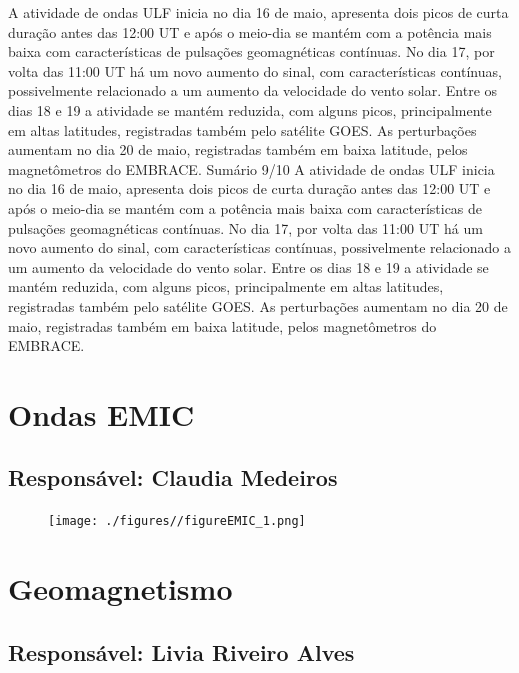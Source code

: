 \documentclass[a4paper, 10pt]{article}
\begin{document}
                        A atividade de ondas ULF inicia no dia 16 de maio, apresenta dois picos de
curta duração antes das 12:00 UT e após o meio-dia se mantém com a
potência mais baixa com características de pulsações geomagnéticas
contínuas. No dia 17, por volta das 11:00 UT há um novo aumento do sinal,
com características contínuas, possivelmente relacionado a um aumento
da velocidade do vento solar. Entre os dias 18 e 19 a atividade se mantém
reduzida, com alguns picos, principalmente em altas latitudes, registradas
também pelo satélite GOES. As perturbações aumentam no dia 20 de maio,
registradas também em baixa latitude, pelos magnetômetros do EMBRACE.
Sumário
9/10
A atividade de ondas ULF inicia no dia 16 de maio, apresenta dois picos de curta duração antes das 12:00 UT e após o meio-dia se mantém com a potência mais baixa com características de pulsações geomagnéticas contínuas. No dia 17, por volta das 11:00 UT há um novo aumento do sinal, com características contínuas, possivelmente relacionado a um aumento da velocidade do vento solar. Entre os dias 18 e 19 a atividade se mantém reduzida, com alguns picos, principalmente em altas latitudes, registradas também pelo satélite GOES. As perturbações aumentam no dia 20 de maio, registradas também em baixa latitude, pelos magnetômetros do EMBRACE.\section{Ondas EMIC} 
 \subsection{Responsável: Claudia Medeiros} 
 
\begin{figure}[H]
    
                        \centering
   
                             \texttt{[image: ./figures//figureEMIC\_1.png]}

                        \end{figure}

                     \section{Geomagnetismo} 
 \subsection{Responsável: Livia Riveiro Alves} 
 
\end{document}

